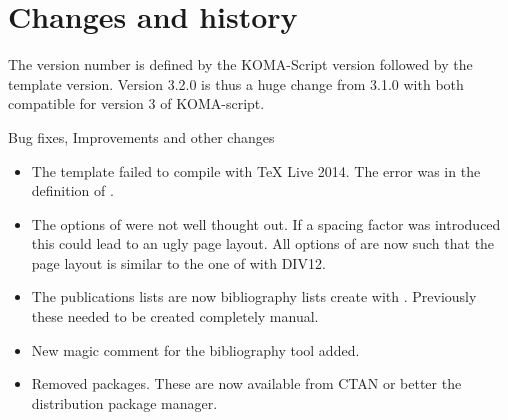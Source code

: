 
\chapter{Changes and history}
\label{appendix:doc:changes}

The version number is defined by the KOMA-Script version followed by the template version. 
Version 3.2.0 is thus a huge change from 3.1.0 with both compatible for version 3 of KOMA-script.


Bug fixes, Improvements and other changes
\begin{itemize}
\item The template failed to compile with TeX Live 2014. The error was in the definition of . 
\item The options of  were not well thought out. If a spacing factor was introduced this could lead to an ugly page layout. All options of  are now such that the page layout is similar to the one of  with DIV12. 
\item The publications lists are now bibliography lists create with . Previously these needed to be created completely manual.
\item New magic comment for the bibliography tool added.
\item Removed packages. These are now available from CTAN or better the distribution package manager. 
\end{itemize}

